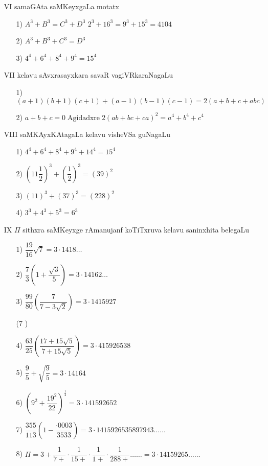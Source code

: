 \begin{enumerate}
\item[{\rm VI}] samaGAta saMKeyxgaLa motatx
\begin{itemize}
\item[{\rm 1)}] $A^{3}+B^{3} = C^{3}+D^{3}$
$2^{3}+16^{3} = 9^{3}+15^{3} = 4104$
\item[{\rm 2)}] $A^{3}+B^{3}+C^{3}=D^{3}$
\item[{\rm 3)}] $4^{4}+6^{4}+8^{4}+9^{4} = 15^{4}$
\end{itemize}

\item[{\rm VII}] kelavu sAvxrasayxkara savaR vagiVRkaraNagaLu
\begin{itemize}
\item[{\rm 1)}] $(a+1)(b+1)(c+1)+(a-1)(b-1)(c-1)=2(a+b+c+abc)$
\item[{\rm 2)}] $a+b+c=0 \; \text{Agidadxre} \; 2(ab+bc+ca)^{2} = a^{4}+b^{4}+c^{4}$
\end{itemize}

\item[{\rm VIII}] saMKAyxKAtagaLa kelavu visheVSa guNagaLu
\begin{itemize}
\item[{\rm 1)}] $4^{4}+6^{4}+8^{4}+9^{4}+14^{4} = 15^{4}$
\item[{\rm 2)}] $\left(11\dfrac{1}{2}\right)^{3}+\left(\dfrac{1}{2}\right)^{3} = (39)^{2}$
\item[{\rm 3)}] $(11)^{3}+(37)^{3} = (228)^{2}$
\item[{\rm 4)}] $3^{3}+4^{3}+5^{3} = 6^{3}$
\end{itemize}

\item[{\rm IX}] $\Pi$ sithxra saMKeyxge rAmanujanf koTiTxruva kelavu saninxhita belegaLu
\begin{itemize}
\item[{\rm 1)}] $\dfrac{19}{16}\sqrt{7}=3\cdot 1418\ldots$
\item[{\rm 2)}] $\dfrac{7}{3} \left(1+\dfrac{\sqrt{3}}{5} \right)=3\cdot 14162\ldots$
\item[{\rm 3)}] $\dfrac{99}{80} \left(\dfrac{7}{7-3\sqrt{2}} \right)= 3\cdot 1415927$

({\rm 7} )
\item[{\rm 4)}] $\dfrac{63}{25} \left(\dfrac{17+15\sqrt{5}}{7+15\sqrt{5}}\right) = 3\cdot 415926538$
\item[{\rm 5)}] $\dfrac{9}{5}+\sqrt{\dfrac{9}{5}}=3\cdot 14164$
\item[{\rm 6)}] $\left(9^{2}+\dfrac{19^{2}}{22} \right)^{\frac{1}{4}}=3\cdot 14 1592652$
\item[{\rm 7)}] $\dfrac{355}{113} \left(1-\dfrac{\cdot0003}{3533}\right)=3\cdot 1415926535897943\ldots\ldots$
\item[{\rm 8)}] $\Pi=3+\dfrac{1}{7+}\cdot \dfrac{1}{15+}\cdot \dfrac{1}{1+}\cdot \dfrac{1}{288+}\ldots\ldots=3\cdot 14 159265\ldots\ldots$
\end{itemize}


\end{enumerate}
